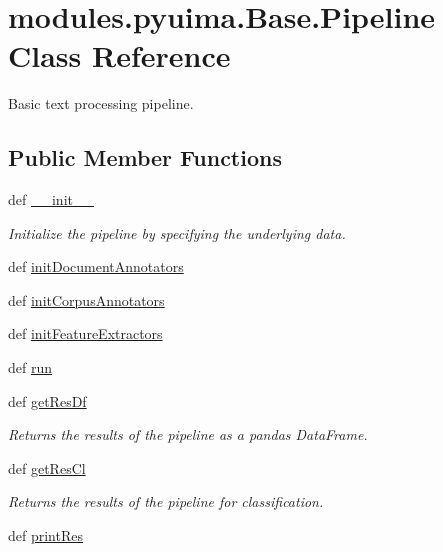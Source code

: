 \hypertarget{classmodules_1_1pyuima_1_1Base_1_1Pipeline}{\section{modules.\-pyuima.\-Base.\-Pipeline \-Class \-Reference}
\label{classmodules_1_1pyuima_1_1Base_1_1Pipeline}
}


\-Basic text processing pipeline.  


\subsection*{\-Public \-Member \-Functions}
\begin{DoxyCompactItemize}
\item 
def \hyperlink{classmodules_1_1pyuima_1_1Base_1_1Pipeline_aaa22060bec72814d9a17a2556e018099}{\-\_\-\-\_\-init\-\_\-\-\_\-}
\begin{DoxyCompactList}\small\item\em \-Initialize the pipeline by specifying the underlying data. \end{DoxyCompactList}\item 
def \hyperlink{classmodules_1_1pyuima_1_1Base_1_1Pipeline_a17e3ed2f3fe7ed9d85c10c2206695e54}{init\-Document\-Annotators}
\item 
def \hyperlink{classmodules_1_1pyuima_1_1Base_1_1Pipeline_a72a014a454b8a9069e688a465b55ebc6}{init\-Corpus\-Annotators}
\item 
def \hyperlink{classmodules_1_1pyuima_1_1Base_1_1Pipeline_a7b05c580656e0958176aa0775a0965b4}{init\-Feature\-Extractors}
\item 
def \hyperlink{classmodules_1_1pyuima_1_1Base_1_1Pipeline_a3850b7f87e16870cd342615c4a25c7e2}{run}
\item 
def \hyperlink{classmodules_1_1pyuima_1_1Base_1_1Pipeline_a1ec1453844e5c3c7035773d87e66fc52}{get\-Res\-Df}
\begin{DoxyCompactList}\small\item\em \-Returns the results of the pipeline as a pandas \-Data\-Frame. \end{DoxyCompactList}\item 
def \hyperlink{classmodules_1_1pyuima_1_1Base_1_1Pipeline_a3055328fdaf274c2d70071e3c99975a1}{get\-Res\-Cl}
\begin{DoxyCompactList}\small\item\em \-Returns the results of the pipeline for classification. \end{DoxyCompactList}\item 
def \hyperlink{classmodules_1_1pyuima_1_1Base_1_1Pipeline_ab821eccc171b86100501271f7e5fbda1}{print\-Res}
\end{DoxyCompactItemize}


